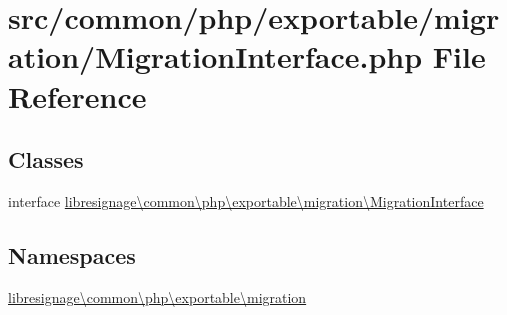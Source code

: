\hypertarget{MigrationInterface_8php}{}\section{src/common/php/exportable/migration/\+Migration\+Interface.php File Reference}
\label{MigrationInterface_8php}
\subsection*{Classes}
\begin{DoxyCompactItemize}
\item 
interface \hyperlink{interfacelibresignage_1_1common_1_1php_1_1exportable_1_1migration_1_1MigrationInterface}{libresignage\textbackslash{}common\textbackslash{}php\textbackslash{}exportable\textbackslash{}migration\textbackslash{}\+Migration\+Interface}
\end{DoxyCompactItemize}
\subsection*{Namespaces}
\begin{DoxyCompactItemize}
\item 
 \hyperlink{namespacelibresignage_1_1common_1_1php_1_1exportable_1_1migration}{libresignage\textbackslash{}common\textbackslash{}php\textbackslash{}exportable\textbackslash{}migration}
\end{DoxyCompactItemize}
